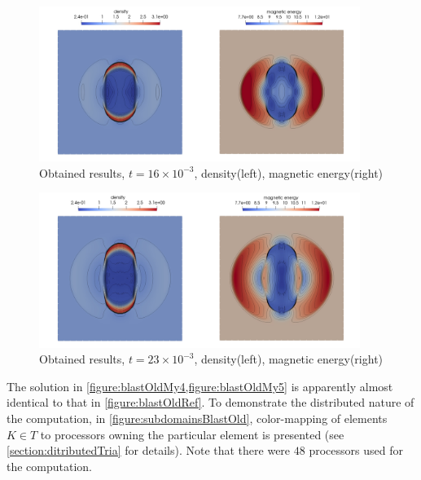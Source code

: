 \begin{figure}[H]
	\begin{center}
		\includegraphics[width=0.93\textwidth]{img/mhd-blast/old/mynew4.jpg}
	\caption{Obtained results, $t = 16\times 10^{-3}$, density(left), magnetic energy(right)}
	\label{figure:blastOldMy4}
	\end{center}
\end{figure}
\vspace{-8mm}

\begin{figure}[H]
	\begin{center}
		\includegraphics[width=0.93\textwidth]{img/mhd-blast/old/mynew5.jpg}
	\caption{Obtained results, $t = 23\times 10^{-3}$, density(left), magnetic energy(right)}
	\label{figure:blastOldMy5}
	\end{center}
\end{figure}
\vspace{-5mm}
The solution in \cref{figure:blastOldMy4,figure:blastOldMy5}  is apparently almost identical to that in \cref{figure:blastOldRef}. To demonstrate the distributed nature of the computation, in \cref{figure:subdomainsBlastOld}, color-mapping of elements $K \in T$ to processors owning the particular element is presented (see \cref{section:ditributedTria} for details). Note that there were $48$ processors used for the computation.


